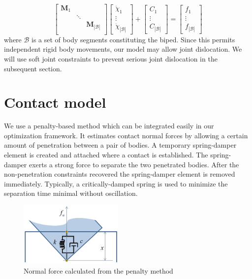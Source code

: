 \documentclass[master,english,final]{kaist-ucs}
\begin{document}
\begin{equation}
\left [
\begin{array}{ccc}
\mathbf{M}_1                      &            &                               \\
                                  &  \ddots    &                               \\
                                  &            & \mathbf{M}_{|\mathcal{B}|}    \\
\end{array}
\right ]
\left [
\begin{array}{c}
\ddot{\chi}_1 \\
\vdots \\
\ddot{\chi}_{|\mathcal{B}|}
\end{array}
\right ]
+
\left [
\begin{array}{c}
C_1 \\
\vdots \\
C_{|\mathcal{B}|}
\end{array}
\right ]
=
\left [
\begin{array}{c}
f_1 \\
\vdots \\
f_{|\mathcal{B}|}
\end{array}
\right ]
\end{equation}
where $\mathcal{B}$ is a set of body segments constituting the biped.
Since this permits independent rigid body movements,
our model may allow joint dislocation.
We will use soft joint constraints to prevent serious
joint dislocation in the subsequent section.



\section{Contact model}
\label{sec:contact}

We use a penalty-based method which can be integrated easily in our optimization framework.
It estimates contact normal forces by allowing a certain amount of penetration between a pair of bodies.
A temporary spring-damper element is created and attached where a contact is established.
The spring-damper exerts a strong force to separate the two penetrated bodies.
After the non-penetration constraints recovered the spring-damper element is removed immediately.
Typically, a critically-damped spring is used to minimize the separation time minimal without oscillation.

\begin{figure}[h!]
  \centering
  \includegraphics[width=2.0in]{penalty}
  \caption{Normal force calculated from the penalty method}
\end{figure}
\end{document}
